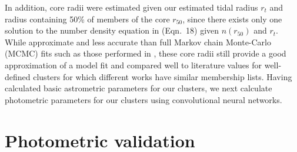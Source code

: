 In addition, \cite{king_structure_star_1962} core radii were estimated given our estimated tidal radius $r_{t}$ and radius containing 50\% of members of the core $r_{50}$, since there exists only one solution to the number density equation in \cite{king_structure_star_1962} (Eqn.~18) given $n(r_{50})$ and $r_{t}$. While approximate and less accurate than full Markov chain Monte-Carlo (MCMC) fits such as those performed in \cite{tarricq_structural_2022}, these core radii still provide a good approximation of a \cite{king_structure_star_1962} model fit and compared well to literature values for well-defined clusters for which different works have similar membership lists. Having calculated basic astrometric parameters for our clusters, we next calculate photometric parameters for our clusters using convolutional neural networks.



\section{Photometric validation}\label{c3:sec:cmd_classifier}  %

